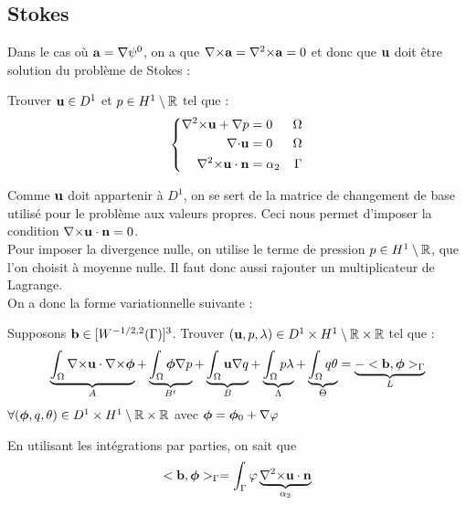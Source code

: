 \documentclass[a4paper,11pt]{article}
\begin{document}
\subsection{Stokes}
Dans le cas où ${\mathbf{a}} = {\nabla}\psi^0$, on a que ${\nabla\times}{\mathbf{a}} = {\nabla^2\times}{\mathbf{a}} = 0$ et donc que ${\mathbf{u}}$ doit être solution du problème de Stokes :
\begin{pb} Trouver ${\mathbf{u}}\in D^1$ et $p\in H^1\setminus {\mathbb{R}}$ tel que :
  \begin{equation*}
    \left\{
    \begin{aligned}
      {\nabla^2\times}{\mathbf{u}} + {\nabla} p &= 0 & \Omega\\
      {\nabla\cdot} {\mathbf{u}} &= 0 & \Omega\\
      {\nabla^2\times}{\mathbf{u}}\cdot{\mathbf{n}} &= \alpha_2 & \Gamma
    \end{aligned}
    \right.
  \end{equation*}
\end{pb}
Comme ${\mathbf{u}}$ doit appartenir à $D^1$, on se sert de la matrice de changement de base utilisé pour le problème aux valeurs propres. Ceci nous permet d'imposer la condition ${\nabla\times}{\mathbf{u}}\cdot{\mathbf{n}}=0$.\\
Pour imposer la divergence nulle, on utilise le terme de pression $p\in H^1\setminus {\mathbb{R}}$, que l'on choisit à moyenne nulle. Il faut donc aussi rajouter un multiplicateur de Lagrange.\\
On a donc la forme variationnelle suivante :
\begin{pb}Supposons ${\mathbf{b}}\in [W^{-1/2,2}(\Gamma)]^3$. Trouver $({\mathbf{u}},p,\lambda)\in D^1\times H^1\setminus{\mathbb{R}}\times{\mathbb{R}}$ tel que :
  \begin{equation*}
    \underbrace{\int_\Omega {\nabla\times}{\mathbf{u}}\cdot{\nabla\times}\bm{\phi}}_{A} + \underbrace{\int_\Omega \bm{\phi}{\nabla} p}_{B^t} + \underbrace{\int_\Omega {\mathbf{u}}{\nabla} q}_{B} + \underbrace{\int_\Omega p\lambda}_\Lambda + \underbrace{\int_\Omega q\theta}_\Theta = \underbrace{- <{\mathbf{b}}, \bm{\phi}>_\Gamma}_L
  \end{equation*}
  $\forall (\bm{\phi},q,\theta)\in D^1\times H^1\setminus{\mathbb{R}}\times{\mathbb{R}}$ avec $\bm{\phi}=\bm{\phi}_0+{\nabla}\varphi$
\end{pb}
En utilisant les intégrations par parties, on sait que
\[<{\mathbf{b}}, \bm{\phi}>_\Gamma=\int_\Gamma \varphi\underbrace{{\nabla^2\times}{\mathbf{u}}\cdot{\mathbf{n}}}_{\alpha_2}\]
\end{document}
